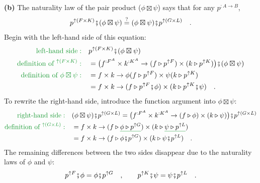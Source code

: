\textbf{(b)} The naturality law of the pair product ($\phi\boxtimes\psi$)
says that for any $p^{:A\rightarrow B}$,
\[
p^{\uparrow(F\times K)}\bef(\phi\boxtimes\psi)\overset{?}{=}(\phi\boxtimes\psi)\bef p^{\uparrow(G\times L)}\quad.
\]
Begin with the left-hand side of this equation:
\begin{align*}
{\color{greenunder}\text{left-hand side}:}\quad & p^{\uparrow(F\times K)}\bef(\phi\boxtimes\psi)\\
{\color{greenunder}\text{definition of }^{\uparrow(F\times K)}:}\quad & =\big(f^{:F^{A}}\times k^{:K^{A}}\rightarrow(f\triangleright p^{\uparrow F})\times(k\triangleright p^{\uparrow K})\big)\bef(\phi\boxtimes\psi)\\
{\color{greenunder}\text{definition of }\phi\boxtimes\psi:}\quad & =f\times k\rightarrow\phi(f\triangleright p^{\uparrow F})\times\psi(k\triangleright p^{\uparrow K})\\
 & =f\times k\rightarrow(f\triangleright p^{\uparrow F}\bef\phi)\times(k\triangleright p^{\uparrow K}\bef\psi)\quad.
\end{align*}
To rewrite the right-hand side, introduce the function argument into
$\phi\boxtimes\psi$:
\begin{align*}
{\color{greenunder}\text{right-hand side}:}\quad & (\phi\boxtimes\psi)\bef p^{\uparrow(G\times L)}=\big(f^{:F^{A}}\times k^{:K^{A}}\rightarrow(f\triangleright\phi)\times(k\triangleright\psi)\big)\bef p^{\uparrow(G\times L)}\\
{\color{greenunder}\text{definition of }^{\uparrow(G\times L)}:}\quad & =f\times k\rightarrow(f\triangleright\gunderline{\phi\triangleright p^{\uparrow G}})\times(k\triangleright\gunderline{\psi\triangleright p^{\uparrow L}})\\
 & =f\times k\rightarrow(f\triangleright\phi\bef p^{\uparrow G})\times(k\triangleright\psi\bef p^{\uparrow L})\quad.
\end{align*}
The remaining differences between the two sides disappear due to the
naturality laws of $\phi$ and $\psi$:
\[
p^{\uparrow F}\bef\phi=\phi\bef p^{\uparrow G}\quad,\quad\quad p^{\uparrow K}\bef\psi=\psi\bef p^{\uparrow L}\quad.
\]

